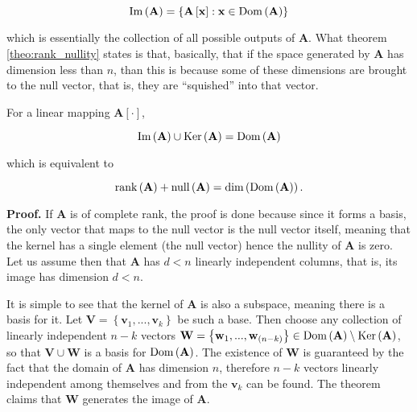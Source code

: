 \begin{equation} \operatorname{Im}\left(\mathbf{A}\right) = \left\{ \mathbf{A}\left[\mathbf{x}\right]: \mathbf{x}\in\operatorname{Dom}\left(\mathbf{A}\right)\right\}\end{equation}

	\noindent which is essentially the collection of all possible outputs of $\mathbf{A}$. What theorem \ref{theo:rank_nullity} states is that, basically, that if the space generated by $\mathbf{A}$ has dimension less than $n$, than this is because some of these dimensions are brought to the null vector, that is, they are ``squished'' into that vector.

\begin{theorem}\label{theo:rank_nullity} %
	For a linear mapping $\mathbf{A}\left[\cdot\right]$, 

\begin{equation} \text{Im}\left(\mathbf{A}\right) \cup \operatorname{Ker}\left(\mathbf{A}\right) = \text{Dom}\left(\mathbf{A}\right) \end{equation}

	\noindent which is equivalent to

\begin{equation} \operatorname{rank}\left(\mathbf{A}\right) + \operatorname{null}\left(\mathbf{A}\right) = \text{dim}\left(\text{Dom}\left(\mathbf{A}\right)\right).\end{equation}
\end{theorem}
\noindent\textbf{Proof.} If $\mathbf{A}$ is of complete rank, the proof is done because since it forms a basis, the only vector that maps to the null vector is the null vector itself, meaning that the kernel has a single element (the null vector) hence the nullity of $\mathbf{A}$ is zero. Let us assume then that $\mathbf{A}$ has $d<n$ linearly independent columns, that is, its image has dimension $d<n$.

	It is simple to see that the kernel of $\mathbf{A}$ is also a subspace, meaning there is a basis for it. Let $\mathbf{V} = \left\{\mathbf{v}_1,...,\mathbf{v}_k\right\}$ be such a base. Then choose any collection of linearly independent $n-k$ vectors $\mathbf{W} = \left\{\mathbf{w}_1,...,\mathbf{w}_{(n-k)}\right\}\in\operatorname{Dom}\left(\mathbf{A}\right)\setminus\operatorname{Ker}\left(\mathbf{A}\right)$, so that $\mathbf{V}\cup\mathbf{W}$ is a basis for $\operatorname{Dom}\left(\mathbf{A}\right)$. The existence of $\mathbf{W}$ is guaranteed by the fact that the domain of $\mathbf{A}$ has dimension $n$, therefore $n-k$ vectors linearly independent among themselves and from the $\mathbf{v}_k$ can be found. The theorem claims that $\mathbf{W}$ generates the image of $\mathbf{A}$.

